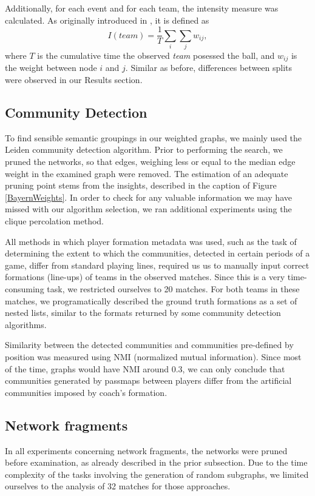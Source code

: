 \documentclass[9pt,twocolumn,twoside]{pnas-report}
\begin{document}
{Additionally, for each event and for each team, the intensity measure was calculated. As originally introduced in \cite{grund}, it is defined as $$I(team) = \frac{1}{T} \sum_{i} \sum_{j} w_{ij},$$ where $T$ is the cumulative time the observed \emph{team} posessed the ball, and $w_{ij}$ is the weight between node $i$ and $j$. Similar as before, differences between splits were observed in our Results section.

\subsection*{Community Detection}
To find sensible semantic groupings in our weighted graphs, we mainly used the Leiden community detection algorithm. Prior to performing the search, we pruned the networks, so that edges, weighing less or equal to the  median edge weight in the examined graph were removed. The estimation of an adequate pruning point stems from the insights, described in the caption of Figure \ref{BayernWeights}. In order to check for any valuable information we may have missed with our algorithm selection, we ran additional experiments using the clique percolation method.

All methods in which player formation metadata was used, such as the task of determining the extent to which the communities, detected in certain periods of a game, differ from standard playing lines, required us us to manually input correct formations (line-ups) of teams in the observed matches. Since this is a very time-consuming task, we restricted ourselves to 20 matches. For both teams in these matches, we programatically described the ground truth formations as a set of nested lists, similar to the formats returned by some community detection algorithms. 


Similarity between the detected communities and communities pre-defined by position was measured using NMI (normalized mutual information). Since most of the time, graphs would have NMI around 0.3, we can only conclude that communities generated by passmaps between players differ from the artificial communities imposed by coach's formation.

 
\subsection*{Network fragments}
In all experiments concerning network fragments, the networks were pruned before examination, as already described in the prior subsection. Due to the time complexity of the tasks involving the generation of random subgraphs, we limited ourselves to the analysis of 32 matches for those approaches.

}
\end{document}

